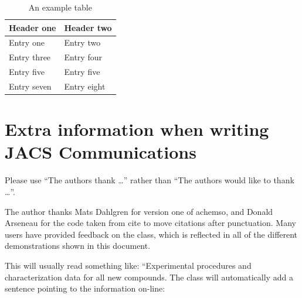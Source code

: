\documentclass[journal=jacsat,manuscript=article]{achemso}
\begin{document}
\begin{table}
  \caption{An example table}
  \label{tbl:example}
  \begin{tabular}{ll}
    \hline
    Header one  & Header two  \\
    \hline
    Entry one   & Entry two   \\
    Entry three & Entry four  \\
    Entry five  & Entry five  \\
    Entry seven & Entry eight \\
    \hline
  \end{tabular}
\end{table}



\section{Extra information when writing JACS Communications}


\begin{acknowledgement}

Please use ``The authors thank \ldots'' rather than ``The
authors would like to thank \ldots''.

The author thanks Mats Dahlgren for version one of \textsf{achemso},
and Donald Arseneau for the code taken from \textsf{cite} to move
citations after punctuation. Many users have provided feedback on the
class, which is reflected in all of the different demonstrations
shown in this document.

\end{acknowledgement}

\begin{suppinfo}

This will usually read something like: ``Experimental procedures and
characterization data for all new compounds. The class will
automatically add a sentence pointing to the information on-line:

\end{suppinfo}


\end{document}
